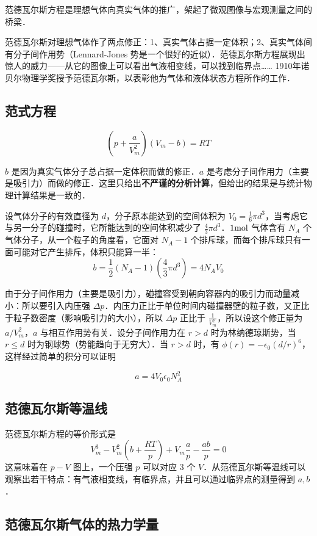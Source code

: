 
\begin{issues}
\issueDraft
\end{issues}

范德瓦尔斯方程是理想气体向真实气体的推广，架起了微观图像与宏观测量之间的桥梁．

范德瓦尔斯对理想气体作了两点修正：1、真实气体占据一定体积；2、真实气体间有分子间作用势（Lennard-Jones 势是一个很好的近似）．范德瓦尔斯方程展现出惊人的威力——从它的图像上可以看出气液相变线，可以找到临界点…… 1910年诺贝尔物理学奖授予范德瓦尔斯，以表彰他为气体和液体状态方程所作的工作．

\subsection{范式方程}

\begin{equation}
\left(p+\frac{a}{V_m^2}\right)(V_m-b)=RT
\end{equation}

$b$ 是因为真实气体分子总占据一定体积而做的修正．$a$ 是考虑分子间作用力（主要是吸引力）而做的修正．这里只给出\textbf{不严谨的分析计算}，但给出的结果是与统计物理计算结果是一致的．

设气体分子的有效直径为 $d$，分子原本能达到的空间体积为 $V_0=\frac{1}{6}\pi d^3$，当考虑它与另一分子的碰撞时，它所能达到的空间体积减少了 $\frac{4}{3}\pi d^3$．$1\rm mol$ 气体含有 $N_A$ 个气体分子，从一个粒子的角度看，它面对 $N_A-1$ 个排斥球，而每个排斥球只有一面可能对它产生排斥，体积只能算一半：
\begin{equation}
b=\frac{1}{2}(N_A-1)(\frac{4}{3}\pi d^3)=4N_A V_0
\end{equation}

由于分子间作用力（主要是吸引力），碰撞容受到朝向容器内的吸引力而动量减小：所以要引入内压强 $\Delta p$．内压力正比于单位时间内碰撞器壁的粒子数，又正比于粒子数密度（影响吸引力的大小），所以 $\Delta p$ 正比于 $\frac{1}{V_m^2}$，所以设这个修正量为 $a/V_m^2$，$a$ 与相互作用势有关．设分子间作用力在 $r>d$ 时为林纳德琼斯势，当 $r\le d$ 时为钢球势（势能趋向于无穷大）．当 $r>d$ 时，有 $\phi(r)=-\epsilon_0(d/r)^6$，这样经过简单的积分可以证明

\begin{equation}
a=4V_0\epsilon_0 N_A^2
\end{equation}

\subsection{范德瓦尔斯等温线}
范德瓦尔斯方程的等价形式是
\begin{equation}
V_m^3-V_m^2(b+\frac{RT}{p})+V_m\frac{a}{p}-\frac{ab}{p}=0
\end{equation}
这意味着在 $p-V$ 图上，一个压强 $p$ 可以对应 $3$ 个 $V$．从范德瓦尔斯等温线可以观察出若干特点：有气液相变线，有临界点，并且可以通过临界点的测量得到 $a,b$．
\subsection{范德瓦尔斯气体的热力学量}
